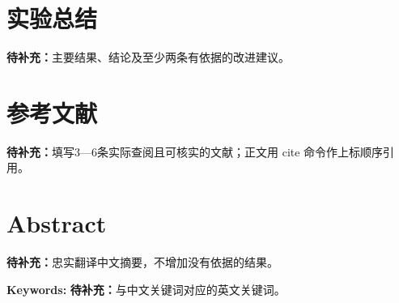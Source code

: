 \documentclass[UTF8,a4paper,12pt,fontset=fandol,scheme=plain]{ctexart}
\newcommand{\ReportTODO}[1]{\textbf{待补充：}#1}
\begin{document}
\section{实验总结}\label{sec:conclusion}
\ReportTODO{主要结果、结论及至少两条有依据的改进建议。}

\section{参考文献}
\ReportTODO{填写3—6条实际查阅且可核实的文献；正文用 cite 命令作上标顺序引用。}

\par\bigskip\noindent\begin{minipage}{\linewidth}
\section*{Abstract}
\ReportTODO{忠实翻译中文摘要，不增加没有依据的结果。}
\par\noindent\textbf{Keywords: }\ReportTODO{与中文关键词对应的英文关键词。}
\end{minipage}\par

\end{document}
